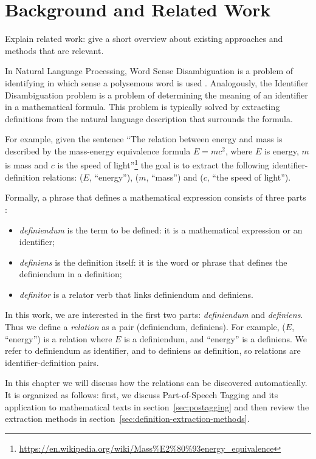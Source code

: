 \section{Background and Related Work}

Explain related work: give a short overview about existing 
approaches and methods that are relevant.


In Natural Language Processing, Word Sense Disambiguation is a problem of
identifying in which sense a polysemous word is used \cite{jurafsky2000speech}.
Analogously, the Identifier Disambiguation problem is a problem of
determining the meaning of an identifier in a mathematical formula. This
problem is typically solved by extracting definitions from the natural
language description that surrounds the formula.

For example, given the sentence ``The relation between energy and mass is
described by  the mass-energy equivalence formula $E = mc^2$,
where $E$ is energy, $m$ is mass and $c$ is the speed of
light''\footnote{\url{https://en.wikipedia.org/wiki/Mass\%E2\%80\%93energy\_equivalence}}
the goal is to extract the following identifier-definition relations:
($E$, ``energy''), ($m$, ``mass'') and ($c$, ``the speed of light'').

Formally, a phrase that defines a mathematical expression consists of three parts \cite{kristianto2012extracting}:

\begin{itemize}
\itemsep1pt\parskip0pt
  \item \emph{definiendum} is the term to be defined: it is a mathematical expression
      or an identifier;
  \item \emph{definiens} is the definition itself: it is the word or phrase that defines the definiendum in a definition;
  \item \emph{definitor} is a relator verb that links definiendum and definiens.
\end{itemize}

In this work, we are interested in the first two parts: \emph{definiendum} and
\emph{definiens}. Thus we define a \emph{relation} as a pair
(definiendum, definiens). For example, ($E$, ``energy'') is a relation where
$E$ is a definiendum, and ``energy'' is a definiens. We refer to definiendum as
identifier, and to definiens as definition, so relations are identifier-definition
pairs.

In this chapter we will discuss how the relations can be discovered automatically.
It is organized as follows: first, we discuss Part-of-Speech Tagging and its application
to mathematical texts in section~\ref{sec:postagging} and then
review the extraction methods in section~\ref{sec:definition-extraction-methods}.


